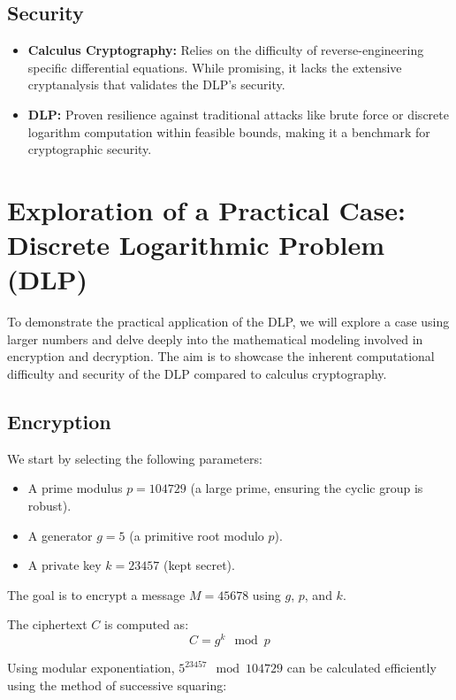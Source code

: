 \documentclass[12pt]{article}
\begin{document}
\subsection*{Security}
\begin{itemize}
    \item \textbf{Calculus Cryptography:} Relies on the difficulty of reverse-engineering specific differential equations. While promising, it lacks the extensive cryptanalysis that validates the DLP's security.
    \item \textbf{DLP:} Proven resilience against traditional attacks like brute force or discrete logarithm computation within feasible bounds, making it a benchmark for cryptographic security.
\end{itemize}





\section*{Exploration of a Practical Case: Discrete Logarithmic Problem (DLP)}

To demonstrate the practical application of the DLP, we will explore a case using larger numbers and delve deeply into the mathematical modeling involved in encryption and decryption. The aim is to showcase the inherent computational difficulty and security of the DLP compared to calculus cryptography.

\subsection*{Encryption}

We start by selecting the following parameters:
\begin{itemize}
    \item A prime modulus \( p = 104729 \) (a large prime, ensuring the cyclic group is robust).
    \item A generator \( g = 5 \) (a primitive root modulo \( p \)).
    \item A private key \( k = 23457 \) (kept secret).
\end{itemize}

The goal is to encrypt a message \( M = 45678 \) using \( g \), \( p \), and \( k \).

The ciphertext \( C \) is computed as:
\[
C = g^k \mod p
\]

Using modular exponentiation, \( 5^{23457} \mod 104729 \) can be calculated efficiently using the method of successive squaring:
\end{document}
